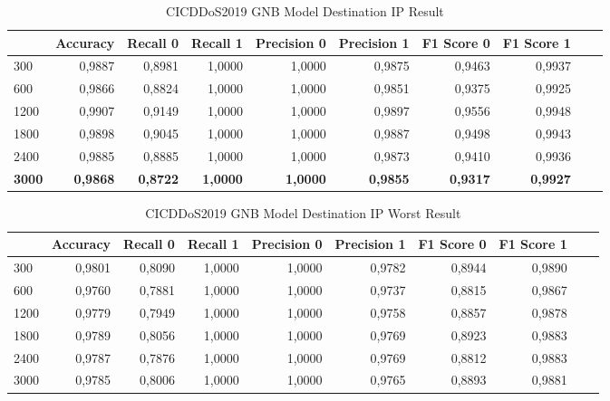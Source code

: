 \documentclass{article}
\begin{document}
\begin{table}
  \centering
  \caption{CICDDoS2019 GNB Model Destination IP Result}
  \label{cicddos2019-gnb-dst-ip-best}
  \begin{tabular}{lrrrrrrrrr}
    \toprule
	{ Pred Win & Accuracy & Recall 0 & Recall 1 & Precision 0 & Precision 1 & F1 Score 0 & F1 Score 1} \\
	\midrule
        300 & 0,9887 & 0,8981 & 1,0000 & 1,0000 & 0,9875 & 0,9463 & 0,9937 \\ \hline
        600 & 0,9866 & 0,8824 & 1,0000 & 1,0000 & 0,9851 & 0,9375 & 0,9925 \\ \hline
        1200 & 0,9907 & 0,9149 & 1,0000 & 1,0000 & 0,9897 & 0,9556 & 0,9948 \\ \hline
        1800 & 0,9898 & 0,9045 & 1,0000 & 1,0000 & 0,9887 & 0,9498 & 0,9943 \\ \hline
        2400 & 0,9885 & 0,8885 & 1,0000 & 1,0000 & 0,9873 & 0,9410 & 0,9936 \\ \hline
        \textbf{3000} & \textbf{0,9868} & \textbf{0,8722} & \textbf{1,0000} & \textbf{1,0000} & \textbf{0,9855} & \textbf{0,9317} & \textbf{0,9927} \\
	\bottomrule
  \end{tabular}
\end{table}

\begin{table}
  \centering
  \caption{CICDDoS2019 GNB Model Destination IP Worst Result}
  \label{cicddos2019-gnb-dst-ip-worst}
  \begin{tabular}{lrrrrrrrrr}
    \toprule
	{ Pred Win & Accuracy & Recall 0 & Recall 1 & Precision 0 & Precision 1 & F1 Score 0 & F1 Score 1} \\
	\midrule
        300 & 0,9801 & 0,8090 & 1,0000 & 1,0000 & 0,9782 & 0,8944 & 0,9890 \\ \hline
        600 & 0,9760 & 0,7881 & 1,0000 & 1,0000 & 0,9737 & 0,8815 & 0,9867 \\ \hline
        1200 & 0,9779 & 0,7949 & 1,0000 & 1,0000 & 0,9758 & 0,8857 & 0,9878 \\ \hline
        1800 & 0,9789 & 0,8056 & 1,0000 & 1,0000 & 0,9769 & 0,8923 & 0,9883 \\ \hline
        2400 & 0,9787 & 0,7876 & 1,0000 & 1,0000 & 0,9769 & 0,8812 & 0,9883 \\ \hline
        3000 & 0,9785 & 0,8006 & 1,0000 & 1,0000 & 0,9765 & 0,8893 & 0,9881 \\ 
	\bottomrule
  \end{tabular}
\end{table}
\end{document}
